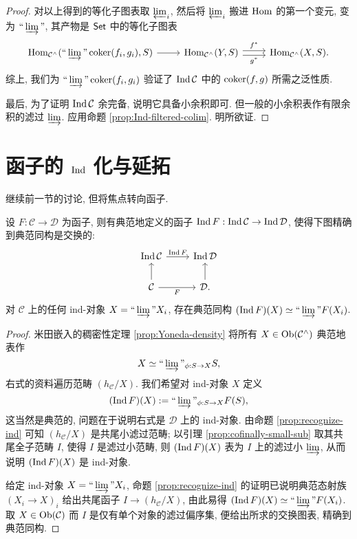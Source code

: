 \begin{proof}
	对以上得到的等化子图表取 $\varprojlim_i$, 然后将 $\varprojlim_i$ 搬进 $\operatorname{Hom}$ 的第一个变元, 变为 $\Yinjlim$, 其产物是 $\mathsf{Set}$ 中的等化子图表
	\[\begin{tikzcd}
		\Hom_{\mathcal{C}^\wedge}(\Yinjlim \Coker(f_i, g_i), S) \arrow[r] &
		\Hom_{\mathcal{C}^\wedge}(Y, S) \arrow[r, shift left, "{f^*}"] \arrow[r, shift right, "{g^*}"'] & \Hom_{\mathcal{C}^\wedge}(X, S).
	\end{tikzcd}\]
	综上, 我们为 $\Yinjlim \Coker(f_i, g_i)$ 验证了 $\operatorname{Ind}\mathcal{C}$ 中的 $\operatorname{coker}(f, g)$ 所需之泛性质.
	
	最后, 为了证明 $\operatorname{Ind}\mathcal{C}$ 余完备, 说明它具备小余积即可. 但一般的小余积表作有限余积的滤过 $\varinjlim$. 应用命题 \ref{prop:Ind-filtered-colim}. 明所欲证.
\end{proof}

\section{函子的 \texorpdfstring{$\operatorname{Ind}$}{Ind} 化与延拓}\label{sec:Indization-functor}
继续前一节的讨论, 但将焦点转向函子.

\begin{definition-proposition}\label{def:Ind-functor}
	设 $F: \mathcal{C} \to \mathcal{D}$ 为函子, 则有典范地定义的函子 $\operatorname{Ind} F: \operatorname{Ind}\mathcal{C} \to \operatorname{Ind}\mathcal{D}$, 使得下图精确到典范同构是交换的:
	\[\begin{tikzcd}
		\IndC\mathcal{C} \arrow[r, "{\IndC F}"] & \IndC \mathcal{D} \\
		\mathcal{C} \arrow[u] \arrow[r, "F"'] & \mathcal{D}. \arrow[u]
	\end{tikzcd}\]
	对 $\mathcal{C}$ 上的任何 ind-对象 $X = \Yinjlim X_i$, 存在典范同构 $(\IndC F)(X) \simeq \Yinjlim F(X_i)$.
\end{definition-proposition}
\begin{proof}
	米田嵌入的稠密性定理 \ref{prop:Yoneda-density} 将所有 $X \in \operatorname{Ob}(\mathcal{C}^\wedge)$ 典范地表作
	\[ X \simeq \Yinjlim_{\phi: S \to X} S, \]
	右式的资料遍历范畴 $(h_{\mathcal{C}}/X)$. 我们希望对 ind-对象 $X$ 定义
	\[ (\IndC F)(X) := \Yinjlim_{\phi: S \to X} F(S), \]
	这当然是典范的, 问题在于说明右式是 $\mathcal{D}$ 上的 ind-对象. 由命题 \ref{prop:recognize-ind} 可知 $(h_{\mathcal{C}}/X)$ 是共尾小滤过范畴; 以引理 \ref{prop:cofinally-small-sub} 取其共尾全子范畴 $I$, 使得 $I$ 是滤过小范畴, 则 $(\operatorname{Ind} F)(X)$ 表为 $I$ 上的滤过小 $\varinjlim$, 从而说明 $(\operatorname{Ind} F)(X)$ 是 ind-对象.
	
	给定 ind-对象 $X = \Yinjlim X_i$, 命题 \ref{prop:recognize-ind} 的证明已说明典范态射族 $(X_i \to X)_i$ 给出共尾函子 $I \to (h_{\mathcal{C}}/X)$, 由此易得 $(\IndC F)(X) \simeq \Yinjlim F(X_i)$. 取 $X \in \operatorname{Ob}(\mathcal{C})$ 而 $I$ 是仅有单个对象的滤过偏序集, 便给出所求的交换图表, 精确到典范同构.
\end{proof}

